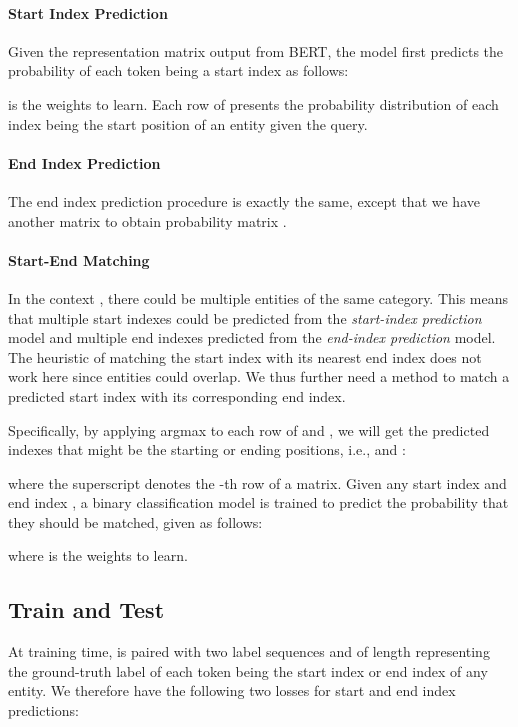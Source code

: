 \documentclass[11pt,a4paper]{article}
\begin{document}
\paragraph{Start Index Prediction}
Given the 
representation matrix 
 output from BERT, the model first  predicts the probability of each token being a start index as follows:

 
 is the weights to learn. Each row of  presents the probability distribution of each index being the start position of an entity given the query. 
 
 \paragraph{End Index Prediction}
The end index prediction procedure is exactly the same, except that we have another matrix  to obtain probability matrix .

 
 


\paragraph{Start-End Matching}
In the  context , there could be multiple entities of the same category. This means
that 
 multiple start indexes could be predicted from the {\it start-index prediction} model and multiple end indexes predicted from the {\it end-index prediction} model. The heuristic of matching the start index with its nearest end index does not work here since entities could overlap. 
We thus further need a method to match a predicted start index with its corresponding end index. 

Specifically, by applying argmax to each row of  and , we will get
the predicted indexes that might be the starting or ending positions, i.e., 
   and :

where the superscript  denotes the -th row of a matrix. Given any start index  and end index  , 
a binary classification model is trained to predict 
the probability that they should be matched, given as follows: 

where  is the weights to learn.

\subsection{Train and Test}
At training time,  is  paired with two 
label sequences  and  of length  
representing the ground-truth label of each token  being the start index or end index of any entity. We therefore have the following two losses for start and end index predictions:
\end{document}
